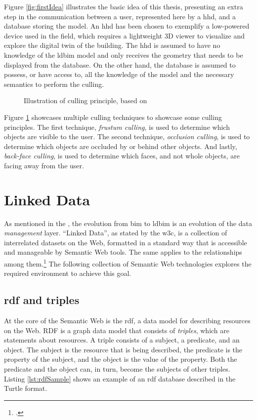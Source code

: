 Figure \ref{fig:firstIdea} illustrates the basic idea of this thesis, presenting an extra step in the communication between a user, represented here by a \ac{hhd}, and a database storing the model. An \ac{hhd} has been chosen to exemplify a low-powered device used in the field, which requires a lightweight 3D viewer to visualize and explore the digital twin of the building. The \ac{hhd} is assumed to have no knowledge of the \ac{ldbim} model and only receives the geometry that needs to be displayed from the database. On the other hand, the database is assumed to possess, or have access to, all the knowledge of the model and the necessary semantics to perform the culling.

\begin{figure}[h]
	\centering
	
	\caption[Illustration of culling principle]{Illustration of culling principle, based on \cite{CullingPrinciples}}
	\label{fig:cullingPrinciple}
\end{figure}

Figure \ref{fig:cullingPrinciple} showcases multiple culling techniques to showcase some culling principles. The first technique, \emph{frustum culling}, is used to determine which objects are visible to the user. The second technique, \emph{occlusion culling}, is used to determine which objects are occluded by or behind other objects. And lastly, \emph{back-face culling}, is used to determine which faces, and not whole objects, are facing away from the user.

\section{Linked Data}

As mentioned in the , the evolution from \ac{bim} to \ac{ldbim} is an evolution of the data \emph{management} layer. \enquote{Linked Data}, as stated by the \ac{w3c}, is a collection of interrelated datasets on the Web, formatted in a standard way that is accessible and manageable by Semantic Web tools. The same applies to the relationships among them.\footcite{w3c} The following collection of Semantic Web technologies explores the required environment to achieve this goal.

\subsection{\acs{rdf} and triples}
At the core of the Semantic Web is the \ac{rdf}, a data model for describing resources on the Web. RDF is a graph data model that consists of \emph{triples}, which are statements about resources. A triple consists of a subject, a predicate, and an object. The subject is the resource that is being described, the predicate is the property of the subject, and the object is the value of the property. Both the predicate and the object can, in turn, become the subjects of other triples. Listing \ref{lst:rdfSample} shows an example of an \ac{rdf} database described in the Turtle format.

